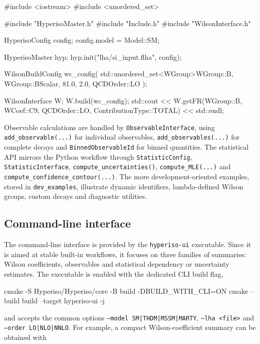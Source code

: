 \documentclass[preprint,11pt]{elsarticle}
\begin{document}
\begin{cppcode}
#include <iostream>
#include <unordered_set>

#include "HyperisoMaster.h"
#include "Include.h"
#include "WilsonInterface.h"

HyperisoConfig config;
config.model = Model::SM;

HyperisoMaster hyp;
hyp.init("lha/si_input.flha", config);

WilsonBuildConfig wc_config(
    std::unordered_set<WGroup>{WGroup::B, WGroup::BScalar},
    81.0, 2.0, QCDOrder::LO
);

WilsonInterface W;
W.build(wc_config);
std::cout << W.getFR(WGroup::B, WCoef::C9,
                     QCDOrder::LO, ContributionType::TOTAL) << std::endl;
\end{cppcode}

Observable calculations are handled by \texttt{ObservableInterface}, using \texttt{add\_observable(...)} for individual observables, \texttt{add\_observables(...)} for complete decays and \texttt{BinnedObservableId} for binned quantities. The statistical API mirrors the Python workflow through \texttt{StatisticConfig}, \texttt{StatisticInterface}, \texttt{compute\_uncertainties()}, \texttt{compute\_MLE(...)} and \texttt{compute\_confidence\_contour(...)}. The more development-oriented examples, stored in \texttt{dev\_examples}, illustrate dynamic identifiers, lambda-defined Wilson groups, custom decays and diagnostic utilities.

\subsection{Command-line interface}

The command-line interface is provided by the \texttt{hyperiso-ui} executable. Since it is aimed at stable built-in workflows, it focuses on three families of summaries: Wilson coefficients, observables and statistical dependency or uncertainty estimates. The executable is enabled with the dedicated CLI build flag,

\begin{terminal}
cmake -S Hyperiso/Hyperiso/core -B build -DBUILD_WITH_CLI=ON
cmake --build build --target hyperiso-ui -j
\end{terminal}

and accepts the common options \texttt{--model SM|THDM|MSSM|MARTY}, \texttt{--lha <file>} and \texttt{--order LO|NLO|NNLO}. For example, a compact Wilson-coefficient summary can be obtained with
\end{document}
